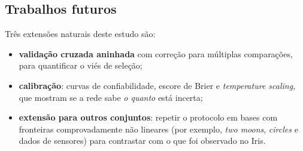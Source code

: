 \subsection{Trabalhos futuros}

Três extensões naturais deste estudo são:

\begin{itemize}
	\item \textbf{validação cruzada aninhada} com correção para múltiplas comparações, para
	      quantificar o viés de seleção;
	\item \textbf{calibração}: curvas de confiabilidade, escore de Brier e \emph{temperature
	      scaling}, que mostram se a rede sabe \emph{o quanto} está incerta;
	\item \textbf{extensão para outros conjuntos}: repetir o protocolo em bases com fronteiras
	      comprovadamente não lineares (por exemplo, \emph{two moons}, \emph{circles} e dados de
	      sensores) para contrastar com o que foi observado no Iris.
\end{itemize}
